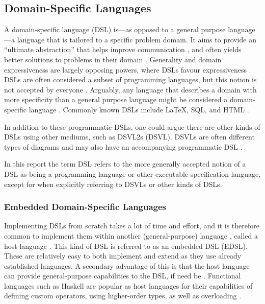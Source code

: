 \newcommand{\dsl}{domain-specific language}
\subsection{Domain-Specific Languages}
A \dsl{} (\gls{DSL}) is---as opposed to a general purpose language---a language that is tailored to a specific problem domain. It aims to provide an ``ultimate abstraction'' 
\cite[pp.~196--es]{buildingdsel} that helps improve communication \cite{fowler_parsons_2010}, and often yields better solutions to problems in their domain \cite{annotatedbibl}. Generality and domain expressiveness are largely opposing powers, where \gls{DSL}s favour expressiveness \cite{mernik_heering_sloane_2005}.
\gls{DSL}s are often considered a subset of programming languages, but this notion is not accepted by everyone \cite{annotatedbibl,fowler_parsons_2010,dsvl}. Arguably, any language that describes a domain with more specificity than a general purpose language might be considered a \dsl{} \cite{dsvl}. Commonly known \gls{DSL}s include \LaTeX, SQL, and HTML \cite{annotatedbibl}. 

In addition to these programmatic \gls{DSL}s, one could argue there are other kinds of \gls{DSL}s using other mediums, such as \gls{DSVL2}s  (\gls{DSVL}).
\gls{DSVL}s are often different types of diagrams and may also have an accompanying programmatic \gls{DSL} \cite{dsvl}. 

In this report the term \gls{DSL} refers to the more generally accepted notion of a \gls{DSL} as being a programming language or other executable specification language, except for when explicitly referring to \gls{DSVL}s or other kinds of \gls{DSL}s.




\subsubsection{Embedded Domain-Specific Languages}\label{sec:edsl}

Implementing \gls{DSL}s from scratch takes a lot of time and effort, and it is therefore common to implement them within another (general-purpose) language \cite{buildingdsel}, called a host language \cite{techniquesforedsls}. This kind of \gls{DSL} is referred to as an embedded DSL (\gls{EDSL}). These are relatively easy to both implement and extend as they use already established languages. 
A secondary advantage of this is that the host language can  provide general-purpose capabilities to the \gls{DSL}, if need be \cite{annotatedbibl}.
Functional languages such as \gls{Haskell} are popular as host languages for their capabilities of defining custom operators, using higher-order types, as well as overloading \cite{techniquesforedsls}.

